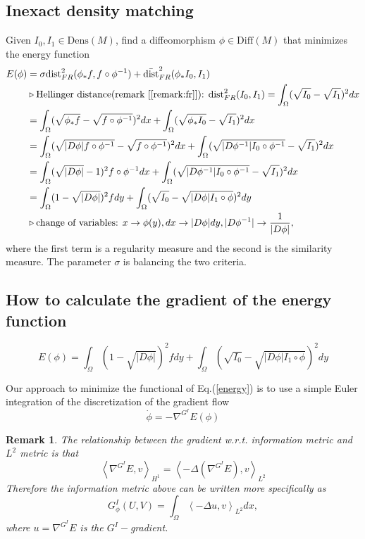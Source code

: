 \documentclass{article}
\theoremstyle{definition}
\theoremstyle{plain}
\newtheorem{remark}{Remark}
\begin{document}
\subsection{Inexact density matching}
Given $I_0,I_1\in\mathrm{Dens}(M)$, find a diffeomorphism $\phi\in\mathrm{Diff}(M)$ that minimizes the energy function
\begin{align*}
    E(\phi)&=\sigma\mathrm{dist}_{FR}^2(\phi_*f,f\circ\phi^{-1})+\Bar{\mathrm{dist}}_{FR}^2(\phi_*I_0,I_1)\\  
     &\triangleright\text{Hellinger distance(remark [\ref{remark:fr}]): }\mathrm{dist}_{FR}^2(I_0,I_1)=\int_\Omega(\sqrt{I_0}-\sqrt{I_1})^2dx\\
     &=\int_\Omega(\sqrt{\phi_*f}-\sqrt{f\circ\phi^{-1}})^2dx+\int_\Omega(\sqrt{\phi_*I_0}-\sqrt{I_1})^2dx\\
     &=\int_\Omega(\sqrt{|D\phi|f\circ\phi^{-1}}-\sqrt{f\circ\phi^{-1}})^2dx+\int_\Omega(\sqrt{|D\phi^{-1}|I_0\circ\phi^{-1}}-\sqrt{I_1})^2dx\\
     &=\int_\Omega(\sqrt{|D\phi|}-1)^2f\circ\phi^{-1}dx+\int_\Omega(\sqrt{|D\phi^{-1}|I_0\circ\phi^{-1}}-\sqrt{I_1})^2dx\\
     &=\int_\Omega(1-\sqrt{|D\phi|})^2fdy+\int_\Omega(\sqrt{I_0}-\sqrt{|D\phi|I_1\circ\phi})^2dy\\
     &\triangleright\text{change of variables: }x\rightarrow\phi(y),dx\rightarrow|D\phi|dy,|D\phi^{-1}|\rightarrow\frac{1}{|D\phi|},
\end{align*}
where the first term is a regularity measure and the second is the similarity measure. The parameter $\sigma$ is balancing the two criteria.

\subsection{How to calculate the gradient of the energy function}
\begin{equation}
    E(\phi)=\int_\Omega(1-\sqrt{|D\phi|})^2fdy+\int_\Omega(\sqrt{I_0}-\sqrt{|D\phi|I_1\circ\phi})^2dy\label{energy}
\end{equation}

Our approach to minimize the functional of Eq.(\ref{energy}) is to use a simple Euler integration of the discretization of the gradient flow
\begin{equation*}
    \Dot{\phi}=-\nabla^{G^I}E(\phi)
\end{equation*}

\begin{remark}
The relationship between the gradient w.r.t. information metric and $L^2$ metric is that
\begin{equation*}
    \left<\nabla^{G^I}E,v\right>_{H^1}=\left<-\Delta(\nabla^{G^I}E),v\right>_{L^2}
\end{equation*}
Therefore the information metric above can be written more specifically as 
\begin{equation*}
    G^I_\phi(U,V)=\int_\Omega\left<-\Delta u,v\right>_{L^2}dx,
\end{equation*}
where $u=\nabla^{G^I}E$ is the $G^I-$gradient.
\end{remark}
\end{document}
